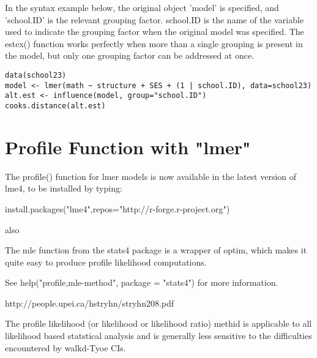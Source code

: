\documentclass[12pt, a4paper]{article}
\begin{document}
In the syntax example below, the original object 'model' is specified, and 'school.ID' is the relevant grouping factor. school.ID is the name of the variable used to indicate the grouping factor when the original model was specified. The estex() function works perfectly when more than a single grouping is present in the model, but only one grouping factor can be addressed at once.

\begin{verbatim}
data(school23)
model <- lmer(math ~ structure + SES + (1 | school.ID), data=school23)
alt.est <- influence(model, group="school.ID")
cooks.distance(alt.est)
\end{verbatim}

\section{Profile Function with "lmer"}

The profile() function for lmer models is now available in the latest version of lme4, to be installed by typing:

install.packages("lme4",repos="http://r-forge.r-project.org")

also

The mle function from the stats4 package is a wrapper of optim, which makes it quite easy to produce 
profile likelihood computations. 

See help("profile,mle-method", package = "stats4") for more information.


http://people.upei.ca/hstryhn/stryhn208.pdf

The profile likelihood (or likelihood or likelihood ratio) methid is applicable to 
all likelihood based statstical analysis and is generally less sensitive to the difficulties
encountered by walkd-Tyoe CIs.
\end{document}
